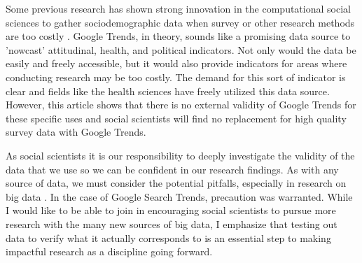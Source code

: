 Some previous research has shown strong innovation in the computational social sciences
to gather sociodemographic data when survey or other research methods are too costly
\citep{blumenstockPredictingPovertyWealth2015}. Google Trends, in theory, sounds like 
a promising data source to 'nowcast' attitudinal, health, and political indicators.
Not only would the data be easily and freely accessible, but it would also provide 
indicators for areas where conducting research may be too costly. The demand for this 
sort of indicator is clear and fields like the health sciences have freely utilized
this data source. However, this article shows that there is
no external validity of Google Trends for these specific uses and social scientists
will find no replacement for high quality survey data with Google Trends. 

As social scientists it is our responsibility to deeply investigate the validity 
of the data that we use so we can be confident in our research findings. As with any
source of data, we must consider the potential pitfalls, especially in research on big data
\citep{mcfarlandBigDataDanger2015}. In the case of Google Search Trends, precaution was 
warranted. While I would like to be able to join \citet{bailCulturalEnvironmentMeasuring2014} 
in encouraging social scientists to pursue more research with the many new sources of big data, 
I emphasize that testing out data to verify what it actually corresponds to is an essential step 
to making impactful research as a discipline going forward.  